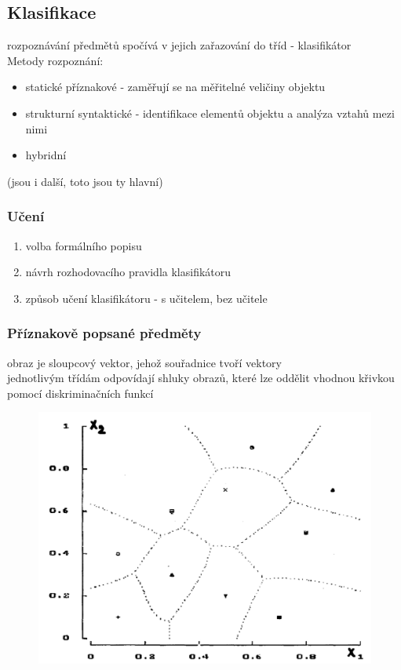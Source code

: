 \subsection{Klasifikace}
rozpoznávání předmětů spočívá v jejich zařazování do tříd - klasifikátor\\
Metody rozpoznání:
\begin{itemize}
    \item statické příznakové - zaměřují se na měřitelné veličiny objektu
    \item strukturní syntaktické - identifikace elementů objektu a analýza vztahů mezi nimi
    \item hybridní
\end{itemize}
(jsou i další, toto jsou ty hlavní)\\
\subsubsection{Učení}
\begin{enumerate}
    \item volba formálního popisu
    \item návrh rozhodovacího pravidla klasifikátoru
    \item způsob učení klasifikátoru - s učitelem, bez učitele
\end{enumerate}
\subsubsection{Příznakově popsané předměty}
obraz je sloupcový vektor, jehož souřadnice tvoří vektory\\
jednotlivým třídám odpovídají shluky obrazů, které lze oddělit vhodnou křivkou pomocí diskriminačních funkcí

\begin{figure}[H]
    \includegraphics[scale = 0.2]{images/priznakove.png}
\end{figure}

